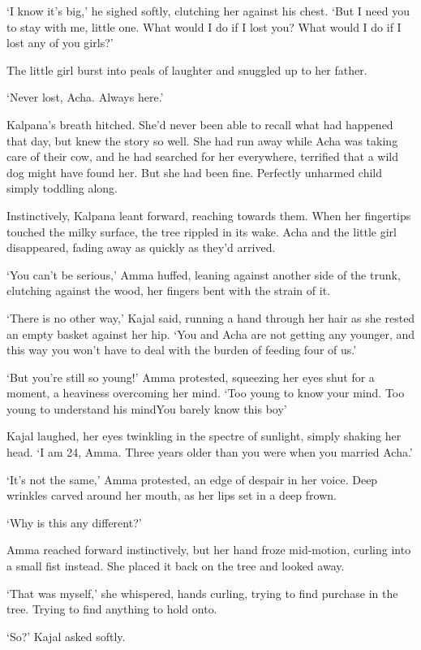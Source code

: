 `I know it's big,' he sighed softly, clutching her against his
chest. `But I need you to stay with me, little one. What would I do if
I lost you? What would I do if I lost any of you girls?'

The little girl burst into peals of laughter and snuggled up to her
father.

`Never lost, Acha. Always here.'

Kalpana's breath hitched. She'd never been able to recall what had
happened that day, but knew the story so well. She had run away while
Acha was taking care of their cow, and he had searched for her
everywhere, terrified that a wild dog might have found her. But she
had been fine. Perfectly unharmed child simply toddling along.

Instinctively, Kalpana leant forward, reaching towards them. When her
fingertips touched the milky surface, the tree rippled in its
wake. Acha and the little girl disappeared, fading away as quickly as
they'd arrived.

`You can't be serious,' Amma huffed, leaning against another side of
the trunk, clutching against the wood, her fingers bent with the
strain of it.

`There is no other way,' Kajal said, running a hand through her hair
as she rested an empty basket against her hip. `You and Acha are not
getting any younger, and this way you won't have to deal with the
burden of feeding four of us.'

`But you're still so young!' Amma protested, squeezing her eyes shut
for a moment, a heaviness overcoming her mind. `Too young to know your
mind. Too young to understand his mind\textemdash You barely know
this boy\textemdash'

Kajal laughed, her eyes twinkling in the spectre of sunlight, simply
shaking her head.  `I am 24, Amma. Three years older than you were
when you married Acha.'

`It's not the same,' Amma protested, an edge of despair in her
voice. Deep wrinkles carved around her mouth, as her lips set in a
deep frown.

`Why is this any different?'

Amma reached forward instinctively, but her hand froze mid-motion,
curling into a small fist instead. She placed it back on the tree and
looked away.

`That was myself,' she whispered, hands curling, trying to find
purchase in the tree. Trying to find anything to hold onto.

`So?' Kajal asked softly.

